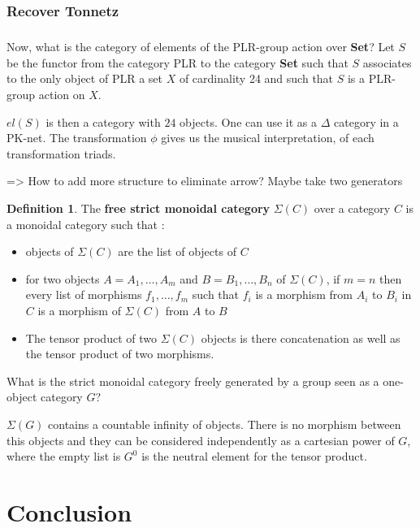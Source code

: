 \documentclass{report}
\theoremstyle{plain}
\theoremstyle{definition}
\newtheorem{defn}{Definition}[section]
\theoremstyle{remark}
\begin{document}
\subsection{Recover Tonnetz}
\paragraph{}
Now, what is the category of elements of the PLR-group action over \textbf{Set}? Let $S$ be the functor from the category PLR to the category \textbf{Set} such that $S$ associates to the only object of PLR a set $X$ of cardinality 24 and such that $S$ is a PLR-group action on $X$.

$el(S)$ is then a category with $24$ objects. One can use it as a $\Delta$ category in a PK-net. The transformation $\phi$ gives us the musical interpretation, of each transformation triads.

=> How to add more structure to eliminate arrow? Maybe take two generators



\begin{defn}
    The \textbf{free strict monoidal category} $ \Sigma (C)$ over a category $C$ is a monoidal category such that :
    \begin{itemize}
        \item objects of $\Sigma (C)$ are the list of objects of $C$
        \item for two objects $A = A_1,\dots,A_m$ and $B = B_1,\dots,B_n$ of $\Sigma (C)$, if $m = n$ then every list of morphisms $f_1,\dots,f_m$ such that $f_i$ is a morphism from $A_i$ to $B_i$ in $C$ is a morphism of $\Sigma(C)$ from $A$ to $B$
        \item The tensor product of two $\Sigma(C)$ objects is there concatenation as well as the tensor product of two morphisms.
    \end{itemize}
\end{defn}

What is the strict monoidal category freely generated by a group seen as a
one-object category $G$?

$\Sigma(G)$ contains a countable infinity of objects. There is no morphism between this objects and they can be considered independently as a cartesian power of $G$, where the empty list is $ G^0$ is the neutral element for the tensor product.


\chapter{Conclusion}

\newpage

 

\end{document}

